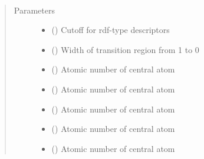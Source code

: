 \documentclass[letterpaper,10pt,english]{sphinxmanual}
\begin{document}
\begin{fulllineitems}
\label{\detokenize{descriptors:gap.descriptors.rdf}}~\begin{quote}\begin{description}
\item[{Parameters}] \leavevmode\begin{itemize}
\item {} 
 () \textendash{} Cutoff for rdf-type descriptors

\item {} 
 () \textendash{} Width of transition region from 1 to 0

\item {} 
 () \textendash{} Atomic number of central atom

\item {} 
 () \textendash{} Atomic number of central atom

\item {} 
 () \textendash{} Atomic number of central atom

\item {} 
 () \textendash{} Atomic number of central atom

\item {} 
 () \textendash{} Atomic number of central atom

\end{itemize}

\end{description}\end{quote}

\end{fulllineitems}
\end{document}
